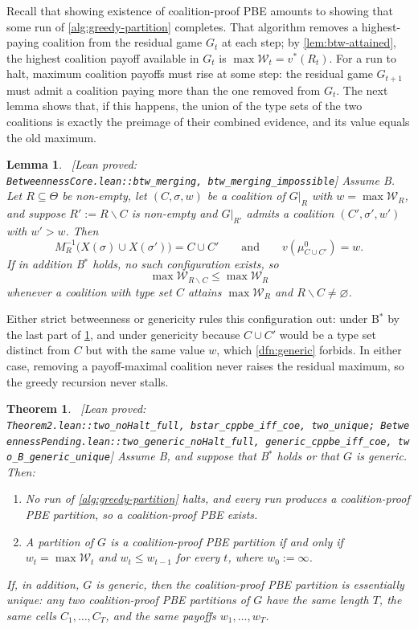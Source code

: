 \documentclass[11pt]{article}
\newtheorem{theorem}{Theorem}
\newtheorem{lemma}{Lemma}
\newcommand{\W}{\mathcal{W}}
\newcommand{\leanproved}[1]{{\footnotesize\textsf{\textcolor{green!55!black}{[Lean proved: \texttt{#1}]}}}}
\begin{document}
Recall that showing existence of coalition-proof PBE amounts to showing that some run of \cref{alg:greedy-partition} completes. That algorithm removes a highest-paying coalition from the residual game $G_t$ at each step; by \cref{lem:btw-attained}, the highest coalition payoff available in $G_t$ is $\max\W_t=v^*(R_t)$. For a run to halt, maximum coalition payoffs must rise at some step: the residual game $G_{t+1}$ must admit a coalition paying more than the one removed from $G_t$. The next lemma shows that, if this happens, the union of the type sets of the two coalitions is exactly the preimage of their combined evidence, and its value equals the old maximum.

\begin{lemma}\label{lem:btw-merging}\ \leanproved{BetweennessCore.lean::btw\_merging,\ btw\_merging\_impossible}
    Assume B. Let $R\subseteq\Theta$ be non-empty, let $(C,\sigma,w)$ be a coalition of $G\vert_R$ with $w=\max\W_R$, and suppose $R':=R\smallsetminus C$ is non-empty and $G\vert_{R'}$ admits a coalition $(C',\sigma',w')$ with $w'>w$. Then
    \[
        M^{-1}_R\bigl(X(\sigma)\cup X(\sigma')\bigr)=C\cup C'
        \qquad\text{and}\qquad
        v(\mu^0_{C\cup C'})=w.
    \]
    If in addition B$^*$ holds, no such configuration exists, so
    \[
        \max\W_{R\smallsetminus C}\leq\max\W_R
    \]
    whenever a coalition with type set $C$ attains $\max\W_R$ and $R\smallsetminus C\neq\varnothing$.
\end{lemma}

Either strict betweenness or genericity rules this configuration out: under B$^*$ by the last part of \cref{lem:btw-merging}, and under genericity because $C\cup C'$ would be a type set distinct from $C$ but with the same value $w$, which \cref{dfn:generic} forbids. In either case, removing a payoff-maximal coalition never raises the residual maximum, so the greedy recursion never stalls.

\begin{theorem}\label{thm:two}\ \leanproved{Theorem2.lean::two\_noHalt\_full,\ bstar\_cppbe\_iff\_coe,\ two\_unique;\ BetweennessPending.lean::two\_generic\_noHalt\_full,\ generic\_cppbe\_iff\_coe,\ two\_B\_generic\_unique}
    Assume B, and suppose that B$^*$ holds or that $G$ is generic. Then:
    \begin{enumerate}
        \item[(i)] No run of \cref{alg:greedy-partition} halts, and every run produces a coalition-proof PBE partition, so a coalition-proof PBE exists.
        \item[(ii)] A partition of $G$ is a coalition-proof PBE partition if and only if $w_t=\max\W_t$ and $w_t\leq w_{t-1}$ for every $t$, where $w_0:=\infty$.
    \end{enumerate}
    If, in addition, $G$ is generic, then the coalition-proof PBE partition is essentially unique: any two coalition-proof PBE partitions of $G$ have the same length $T$, the same cells $C_1,\dots,C_T$, and the same payoffs $w_1,\dots,w_T$.
\end{theorem}
\end{document}
